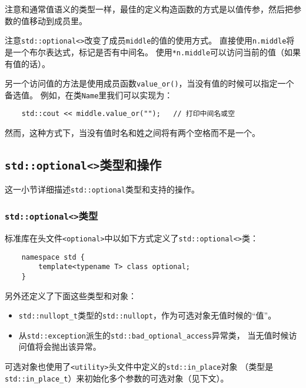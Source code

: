 注意和通常值语义的类型一样，最佳的定义构造函数的方式是以值传参，然后把参数的值移动到成员里。

注意\texttt{std::optional<>}改变了成员\texttt{middle}的值的使用方式。
直接使用\texttt{n.middle}将是一个布尔表达式，标记是否有中间名。
使用\texttt{*n.middle}可以访问当前的值（如果有值的话）。

另一个访问值的方法是使用成员函数\texttt{value\_or()}，当没有值的时候可以指定一个备选值。
例如，在类\texttt{Name}里我们可以实现为：
\begin{lstlisting}
    std::cout << middle.value_or("");   // 打印中间名或空
\end{lstlisting}
然而，这种方式下，当没有值时名和姓之间将有两个空格而不是一个。

\subsection{\texttt{std::optional<>}类型和操作}
这一小节详细描述\texttt{std::optional}类型和支持的操作。

\subsubsection{\texttt{std::optional<>}类型}
标准库在头文件\texttt{<optional>}中以如下方式定义了\texttt{std::optional<>}类：
\begin{lstlisting}
    namespace std {
        template<typename T> class optional;
    }
\end{lstlisting}
另外还定义了下面这些类型和对象：
\begin{itemize}[leftmargin=*]
    \item \texttt{std::nullopt\_t}类型的\texttt{std::nullopt}，作为可选对象无值时候的“值”。
    \item 从\texttt{std::exception}派生的\texttt{std::bad\_optional\_access}异常类，
    当无值时候访问值将会抛出该异常。
\end{itemize}
可选对象也使用了\texttt{<utility>}头文件中定义的\texttt{std::in\_place}对象
（类型是\texttt{std::in\_place\_t}）来初始化多个参数的可选对象（见下文）。

